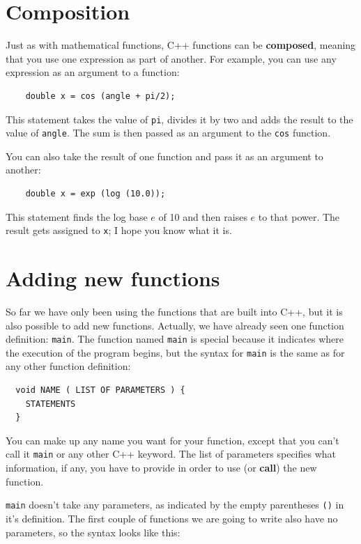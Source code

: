 \section {Composition}
\label{composition}

Just as with mathematical functions, C++ functions can be {\bf
composed}, meaning that you use one expression as part of another.
For example, you can use any expression as an argument to a function:

\begin{verbatim}
    double x = cos (angle + pi/2);
\end{verbatim}
%
This statement takes the value of {\tt pi}, divides it by two and
adds the result to the value of {\tt angle}.  The sum is
then passed as an argument to the {\tt cos} function.

You can also take the result of one function and pass it as
an argument to another:

\begin{verbatim}
    double x = exp (log (10.0));
\end{verbatim}
%
This
statement finds the log base $e$ of 10 and then raises $e$ to that
power.  The result gets assigned to {\tt x}; I hope you know what it
is.

\section{Adding new functions}

So far we have only been using the functions that are built into C++,
but it is also possible to add new functions.  Actually, we have already
seen one function definition: {\tt main}.  The function named {\tt main}
is special because it indicates where the execution of the program
begins, but the syntax for {\tt main} is the same as for any other
function definition:

\begin{verbatim}
  void NAME ( LIST OF PARAMETERS ) {
    STATEMENTS
  }
\end{verbatim}
%
You can make up any name you want for your function, except
that you can't call it {\tt main} or any other
C++ keyword.  The list of
parameters specifies what information, if any, you have to
provide in order to use (or {\bf call}) the new function.

{\tt main} doesn't take any parameters, as indicated by
the empty parentheses {\tt ()} in it's definition.  The first couple
of functions we are going to write also have no parameters, so the
syntax looks like this:

